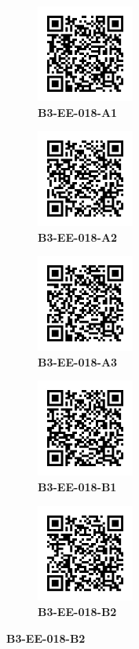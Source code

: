 \documentclass{article}
\begin{document}
	\clearpage
	\begin{figure}[]
		\centering
		\begin{subfigure}{0.19\textwidth}
			\centering
			\includegraphics[width = 3.2cm,height = 3.2cm]{B3-EE-018-A1}
			\caption*{\large{\textbf{B3-EE-018-A1}}}
		\end{subfigure}\hfil
		\begin{subfigure}{0.19\textwidth}
			\centering
			\includegraphics[width = 3.2cm,height = 3.2cm]{B3-EE-018-A2}
			\caption*{\large{\textbf{B3-EE-018-A2}}}
		\end{subfigure}\hfil
		\begin{subfigure}{0.19\textwidth}
			\centering
			\includegraphics[width = 3.2cm,height = 3.2cm]{B3-EE-018-A3}
			\caption*{\large{\textbf{B3-EE-018-A3}}}
		\end{subfigure}\hfil
		\begin{subfigure}{0.19\textwidth}
			\centering
			\includegraphics[width = 3.2cm,height = 3.2cm]{B3-EE-018-B1}
			\caption*{\large{\textbf{B3-EE-018-B1}}}
		\end{subfigure}\hfil
		\begin{subfigure}{0.19\textwidth}
			\centering
			\includegraphics[width = 3.2cm,height = 3.2cm]{B3-EE-018-B2}
			\caption*{\large{\textbf{B3-EE-018-B2}}}
		\end{subfigure}\hfil
	\end{figure}
\end{document}
